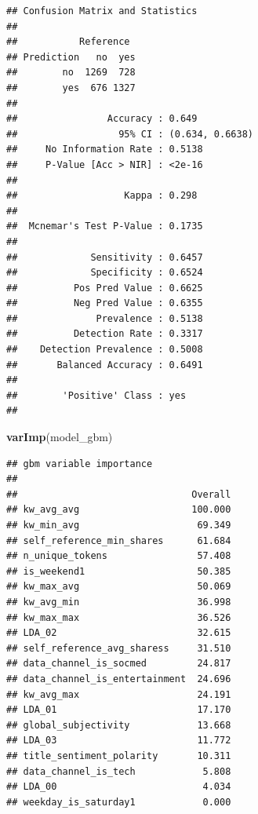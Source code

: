 \documentclass[]{article}
\newenvironment{Shaded}{\begin{snugshade}}{\end{snugshade}}
\newcommand{\KeywordTok}[1]{\textcolor[rgb]{0.13,0.29,0.53}{\textbf{#1}}}
\newcommand{\NormalTok}[1]{#1}
\begin{document}
\begin{verbatim}
## Confusion Matrix and Statistics
## 
##           Reference
## Prediction   no  yes
##        no  1269  728
##        yes  676 1327
##                                          
##                Accuracy : 0.649          
##                  95% CI : (0.634, 0.6638)
##     No Information Rate : 0.5138         
##     P-Value [Acc > NIR] : <2e-16         
##                                          
##                   Kappa : 0.298          
##                                          
##  Mcnemar's Test P-Value : 0.1735         
##                                          
##             Sensitivity : 0.6457         
##             Specificity : 0.6524         
##          Pos Pred Value : 0.6625         
##          Neg Pred Value : 0.6355         
##              Prevalence : 0.5138         
##          Detection Rate : 0.3317         
##    Detection Prevalence : 0.5008         
##       Balanced Accuracy : 0.6491         
##                                          
##        'Positive' Class : yes            
## 
\end{verbatim}

\begin{Shaded}
\begin{Highlighting}[]
\KeywordTok{varImp}\NormalTok{(model_gbm)}
\end{Highlighting}
\end{Shaded}

\begin{verbatim}
## gbm variable importance
## 
##                               Overall
## kw_avg_avg                    100.000
## kw_min_avg                     69.349
## self_reference_min_shares      61.684
## n_unique_tokens                57.408
## is_weekend1                    50.385
## kw_max_avg                     50.069
## kw_avg_min                     36.998
## kw_max_max                     36.526
## LDA_02                         32.615
## self_reference_avg_sharess     31.510
## data_channel_is_socmed         24.817
## data_channel_is_entertainment  24.696
## kw_avg_max                     24.191
## LDA_01                         17.170
## global_subjectivity            13.668
## LDA_03                         11.772
## title_sentiment_polarity       10.311
## data_channel_is_tech            5.808
## LDA_00                          4.034
## weekday_is_saturday1            0.000
\end{verbatim}
\end{document}
